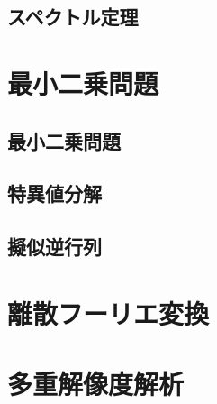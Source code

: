 \documentclass[../../main]{subfiles}
\begin{document}
\subsection{スペクトル定理}

\section{最小二乗問題}

\subsection{最小二乗問題}
\subsection{特異値分解}
\subsection{擬似逆行列}

\section{離散フーリエ変換}

\section{多重解像度解析}
\end{document}
